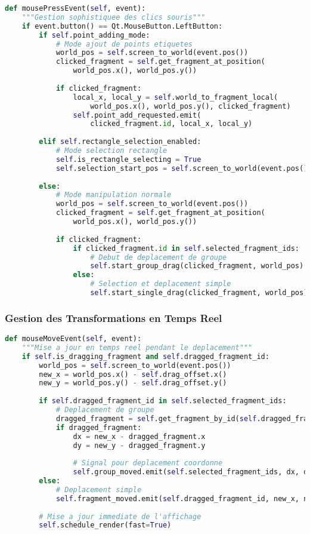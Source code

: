 \documentclass[12pt,a4paper]{article}
\begin{document}
\begin{lstlisting}[language=Python]
def mousePressEvent(self, event):
    """Gestion sophistiquee des clics souris"""
    if event.button() == Qt.MouseButton.LeftButton:
        if self.point_adding_mode:
            # Mode ajout de points etiquetes
            world_pos = self.screen_to_world(event.pos())
            clicked_fragment = self.get_fragment_at_position(
                world_pos.x(), world_pos.y())
            
            if clicked_fragment:
                local_x, local_y = self.world_to_fragment_local(
                    world_pos.x(), world_pos.y(), clicked_fragment)
                self.point_add_requested.emit(
                    clicked_fragment.id, local_x, local_y)
        
        elif self.rectangle_selection_enabled:
            # Mode selection rectangle
            self.is_rectangle_selecting = True
            self.selection_start_pos = self.screen_to_world(event.pos())
            
        else:
            # Mode manipulation normale
            world_pos = self.screen_to_world(event.pos())
            clicked_fragment = self.get_fragment_at_position(
                world_pos.x(), world_pos.y())
            
            if clicked_fragment:
                if clicked_fragment.id in self.selected_fragment_ids:
                    # Debut de deplacement de groupe
                    self.start_group_drag(clicked_fragment, world_pos)
                else:
                    # Selection et deplacement simple
                    self.start_single_drag(clicked_fragment, world_pos)
\end{lstlisting}

\subsubsection{Gestion des Transformations en Temps Reel}

\begin{lstlisting}[language=Python]
def mouseMoveEvent(self, event):
    """Mise a jour en temps reel pendant le deplacement"""
    if self.is_dragging_fragment and self.dragged_fragment_id:
        world_pos = self.screen_to_world(event.pos())
        new_x = world_pos.x() - self.drag_offset.x()
        new_y = world_pos.y() - self.drag_offset.y()
        
        if self.dragged_fragment_id in self.selected_fragment_ids:
            # Deplacement de groupe
            dragged_fragment = self.get_fragment_by_id(self.dragged_fragment_id)
            if dragged_fragment:
                dx = new_x - dragged_fragment.x
                dy = new_y - dragged_fragment.y
                
                # Signal pour deplacement coordonne
                self.group_moved.emit(self.selected_fragment_ids, dx, dy)
        else:
            # Deplacement simple
            self.fragment_moved.emit(self.dragged_fragment_id, new_x, new_y)
        
        # Mise a jour immediate de l'affichage
        self.schedule_render(fast=True)
\end{lstlisting}
\end{document}
